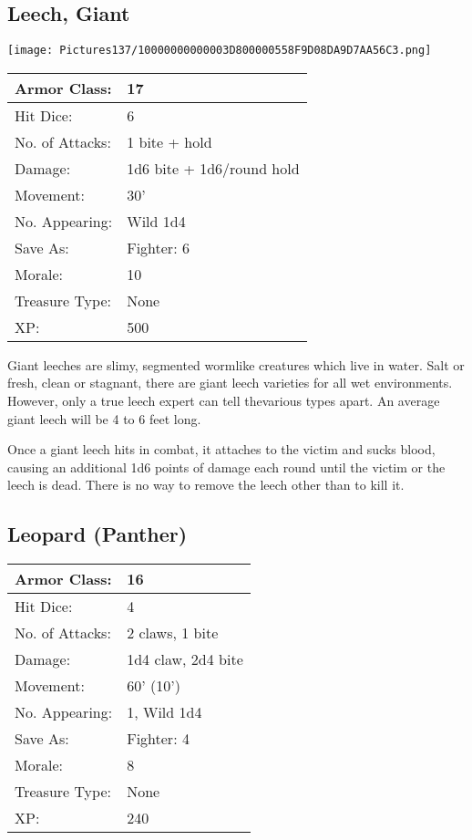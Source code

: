 \documentclass[a4paper,twoside,openany,10pt]{book}
\begin{document}
\begin{multicols}{2}
\subsection*{Leech, Giant}\label{leech-giant}


\begin{center} \texttt{[image: Pictures137/10000000000003D800000558F9D08DA9D7AA56C3.png]} \end{center}

\begin{flushleft}
	\begin{tabularx}{0.50\textwidth}{@{}lX@{}}
Armor Class: & 17 \\\hline
Hit Dice: & 6 \\\hline
No. of Attacks: & 1 bite + hold \\\hline
Damage: & 1d6 bite + 1d6/round hold \\\hline
Movement: & 30' \\\hline
No. Appearing: & Wild 1d4 \\\hline
Save As: & Fighter: 6 \\\hline
Morale: & 10 \\\hline
Treasure Type: & None \\\hline
XP: & 500 \\\hline
\end{tabularx}\medskip
\end{flushleft}

Giant leeches are slimy, segmented wormlike creatures which live in water. Salt or fresh, clean or stagnant, there are giant leech varieties for all wet environments. However, only a true leech expert can tell thevarious types apart. An average giant leech will be 4 to 6 feet long.

Once a giant leech hits in combat, it attaches to the victim and sucks blood, causing an additional 1d6 points of damage each round until the victim or the leech is dead. There is no way to remove the leech other than to kill it.


\subsection*{Leopard (Panther)}\label{leopard-panther}

\begin{tabularx}{0.50\textwidth}{@{}lX@{}}
Armor Class: & 16 \\\hline
Hit Dice: & 4 \\\hline
No. of Attacks: & 2 claws, 1 bite \\\hline
Damage: & 1d4 claw, 2d4 bite \\\hline
Movement: & 60' (10') \\\hline
No. Appearing: & 1, Wild 1d4 \\\hline
Save As: & Fighter: 4 \\\hline
Morale: & 8 \\\hline
Treasure Type: & None \\\hline
XP: & 240 \\\hline
\end{tabularx}\medskip


\end{multicols}
\end{document}
